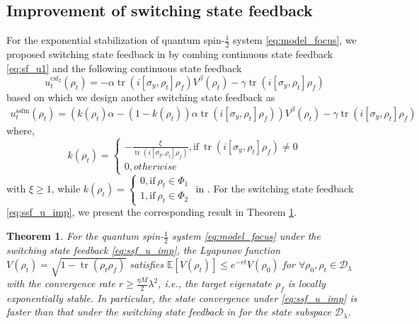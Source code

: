 \documentclass[]{elsarticle}
\newtheorem{thm}{Theorem}
\begin{document}
\subsection{Improvement of switching state feedback}
For the exponential stabilization of quantum spin-$\frac{1}{2}$ system \eqref{eq:model_focus}, we proposed switching state feedback in \cite{WSJZJ2021b} by combing continuous state feedback \eqref{eq:sf_u1} and the following continuous state feedback
\begin{equation}\label{eq:sf_u2}
	u_t^{\mathrm{csf_2}}\left(\rho_{t}\right)=-\alpha \operatorname{tr}\left(i\left[\sigma_{y}, \rho_{t}\right] \rho_f\right)V^{\beta}\left(\rho_{t}\right)-\gamma \operatorname{tr}\left(i\left[\sigma_{y}, \rho_{t}\right] \rho_f\right)
\end{equation}
based on which we design another switching state feedback as
\begin{equation}\label{eq:ssf_u_imp}
	\begin{aligned}
		u_t^{\mathrm{ssfm}}\left(\rho_{t}\right)=\left(k\left(\rho_{t}\right)\alpha-\left(1-k\left(\rho_{t}\right)\right)\alpha \operatorname{tr}\left(i\left[\sigma_{y}, \rho_{t}\right] \rho_f\right)\right)V^{\beta}\left(\rho_{t}\right)
		-\gamma \operatorname{tr}\left(i\left[\sigma_{y}, \rho_{t}\right] \rho_f\right)
	\end{aligned}
\end{equation}
where, 
\begin{equation}\label{eq:k_rho}
	k\left(\rho_{t}\right)=\left\{\begin{array}{l}
		-\frac{\xi}{\operatorname{tr}\left(i\left[\sigma_{y}, \rho_{t}\right] \rho_f\right)}, \text{if}~\operatorname{tr}\left(i\left[\sigma_{y}, \rho_t\right] \rho_f\right)\neq0 \\
		0, otherwise
	\end{array}\right.
\end{equation}
with $\xi\ge 1$, while $k\left(\rho_{t}\right)=\left\{ \begin{array}{l}0 , \text{if}~\rho_t\in\Phi_1\\ 1, \text{if}~ \rho_t\in\Phi_2 \end{array} \right.$ in \cite{WSJZJ2021b}. For the switching state feedback \eqref{eq:ssf_u_imp}, we present the corresponding result in Theorem \ref{thm:exponentially_stable_ssf}.
\begin{thm}\label{thm:exponentially_stable_ssf}
	For the quantum spin-$\frac{1}{2}$ system \eqref{eq:model_focus} under the switching state feedback \eqref{eq:ssf_u_imp}, the Lyapunov function $V(\rho_{t})=\sqrt{1-\operatorname{tr}\left(\rho_t\rho_f\right)}$ satisfies $\mathbb{E}\left[V\left(\rho_{t}\right)\right]\le e^{-r t} V\left(\rho_{0}\right)$ for $\forall \rho_{0}, \rho_{t}\in \mathcal{D}_\lambda$ with the convergence rate $r\ge\frac{{\eta M}}{2}\lambda^{2}$,  i.e., the target eigenstate $\rho_f$ is locally exponentially stable. In particular, the state convergence under \eqref{eq:ssf_u_imp} is faster than that under the switching state feedback in \cite{WSJZJ2021b}  for the state subspace $\mathcal{D}_\lambda$.
\end{thm}
\end{document}
